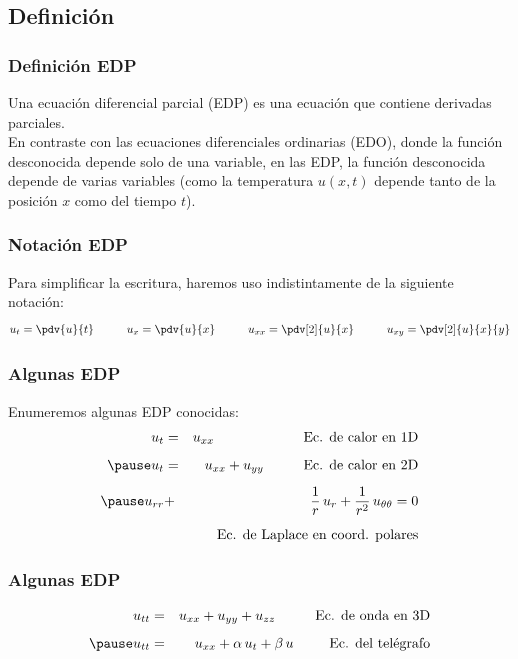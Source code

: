 \subsection{Definición}
\begin{frame}
\frametitle{Definición EDP}
Una ecuación diferencial parcial (EDP) es una ecuación que contiene derivadas parciales. 
\\
\bigskip
En contraste con las ecuaciones diferenciales ordinarias (EDO), donde la función desconocida depende solo de una variable, en las EDP, la función desconocida depende de varias variables (como la temperatura $u (x, t)$ depende tanto de la posición $x$ como del tiempo $t$).
\end{frame}
\begin{frame}
\frametitle{Notación EDP}
Para simplificar la escritura, haremos uso indistintamente de la siguiente notación:
\begin{align*}
u_{t} = \pdv{u}{t} \hspace{1cm} u_{x} = \pdv{u}{x} \hspace{1cm} u_{xx} = \pdv[2]{u}{x} \hspace{1cm} u_{xy} = \pdv[2]{u}{x}{y}
\end{align*}
\end{frame}
\begin{frame}
\frametitle{Algunas EDP}
Enumeremos algunas EDP conocidas:
\begin{eqnarray*}
u_{t} &=& u_{xx} \hspace{2.25cm} \mbox{Ec. de calor en 1D} \\[0.5em] \pause
u_{t} &=& u_{xx} + u_{yy} \hspace{1cm} \mbox{Ec. de calor en 2D} \\[0.5em] \pause
u_{rr} &+& \dfrac{1}{r} \, u_{r} + \dfrac{1}{r^{2}} \, u_{\theta \theta} = 0 \\[0.5em]
&{}& \mbox{Ec. de Laplace en coord. polares}
\end{eqnarray*}
\end{frame}
\begin{frame}
\frametitle{Algunas EDP}
\begin{eqnarray*}
u_{tt} &=& u_{xx} + u_{yy} + u_{zz} \hspace{1cm} \mbox{Ec. de onda en 3D} \\[0.5em] \pause
u_{tt} &=& u_{xx} + \alpha \, u_{t} + \beta \, u \hspace{0.9cm} \mbox{Ec. del telégrafo}
\end{eqnarray*}
\end{frame}

